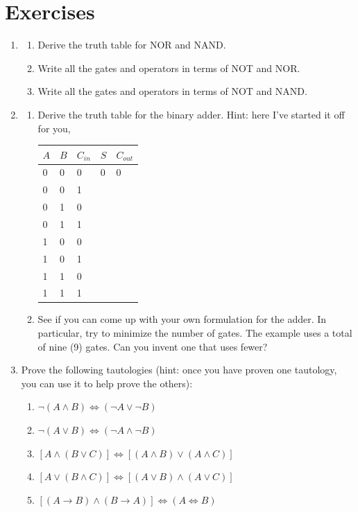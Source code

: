 \documentclass{article}
\begin{document}
\section{Exercises}

\begin{enumerate}
\item
\begin{enumerate}
	\item Derive the truth table for NOR and NAND.
	\item Write all the gates and operators in terms of NOT and NOR.
	\item Write all the gates and operators in terms of NOT and NAND.
\end{enumerate}
	\item
\begin{enumerate}
	\item Derive the truth table for the binary adder. Hint: here I've started it off for you,

		\begin{tabular}{lll|ll}
			$A$ & $B$ & $C_{in}$ & $S$ & $C_{out}$ \\ \hline
			0 & 0 & 0 & 0 & 0\\
			0 & 0 & 1 & & \\
			0 & 1 & 0 & & \\
			0 & 1 & 1 & & \\
			1 & 0 & 0 & & \\
			1 & 0 & 1 & & \\
			1 & 1 & 0 & & \\
			1 & 1 & 1 & &
		\end{tabular}

	\item See if you can come up with your own formulation for the adder.
		In particular, try to minimize the number of gates.
		The example uses a total of nine (9) gates. 
		Can you invent one that uses fewer?
\end{enumerate}
	\item
Prove the following tautologies (hint: once you have proven one tautology, you can use
it to help prove the others):
\begin{enumerate}
	\item $\lnot(A \land B) \iff (\lnot A \lor \lnot B)$
	\item $\lnot (A \lor B) \iff (\lnot A \land \lnot B)$
	\item $\left [ A \land (B \lor C) \right ] \iff \left [ (A \land B) \lor (A \land C) \right ]$
	\item $\left [A \lor (B \land C)\right ] \iff \left [ (A \lor B) \land (A \lor C) \right ]$
\item $\left [ (A \rightarrow B) \land (B \rightarrow A) \right ] \iff (A \iff B)$
\end{enumerate}
\end{enumerate}
\end{document}
